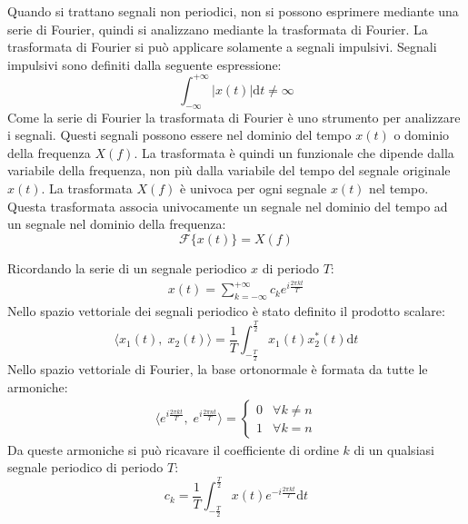 \documentclass{article}
\newcommand{\df}{\mathrm{d}}
\numberwithin{equation}{subsection}
\begin{document}
Quando si trattano segnali non periodici, non si possono esprimere mediante una serie di Fourier, quindi si analizzano mediante la trasformata di Fourier. 
La trasformata di Fourier si può applicare solamente a segnali impulsivi. Segnali impulsivi sono definiti dalla seguente espressione:
\begin{equation}
    \displaystyle\int_{-\infty}^{+\infty}|x(t)|\df t\neq\infty
\end{equation}
Come la serie di Fourier la trasformata di Fourier è uno strumento per analizzare i segnali. Questi segnali possono essere nel dominio del tempo $x(t)$ o dominio 
della frequenza $X(f)$. La trasformata è quindi un funzionale che dipende dalla variabile della frequenza, non più dalla variabile del tempo del segnale originale $x(t)$. 
La trasformata $X(f)$ è univoca per ogni segnale $x(t)$ nel tempo. Questa trasformata associa univocamente un segnale nel dominio del tempo ad un segnale nel dominio della 
frequenza:   
\begin{equation*}
    \mathscr{F}\{x(t)\}=X(f)
\end{equation*}

Ricordando la serie di un segnale periodico $x$ di periodo $T$:
\begin{gather*}
    x(t)=\displaystyle\sum_{k=-\infty}^{+\infty}c_ke^{i\frac{2\pi kt}{T}}
\end{gather*}
Nello spazio vettoriale dei segnali periodico è stato definito il prodotto scalare:
\begin{equation*}
    \langle x_1(t),\;x_2(t)\rangle=\displaystyle\frac{1}{T}\int_{-\frac{T}{2}}^{\frac{T}{2}}x_1(t)x_2^*(t)\df t
\end{equation*}
Nello spazio vettoriale di Fourier, la base ortonormale è formata da tutte le armoniche:
\begin{gather*}
    \langle e^{i\frac{2\pi kt}{T}},\;e^{i\frac{2\pi nt}{T}}\rangle=\begin{cases}
        0&\forall k\neq n\\
        1&\forall k=n
    \end{cases}
\end{gather*} 
Da queste armoniche si può ricavare il coefficiente di ordine $k$ di un qualsiasi segnale periodico di periodo $T$:
\begin{equation*}
    c_k=\displaystyle\frac{1}{T}\int_{-\frac{T}{2}}^{\frac{T}{2}}x(t)e^{-i\frac{2\pi kt}{T}}\df t
\end{equation*}
\end{document}
